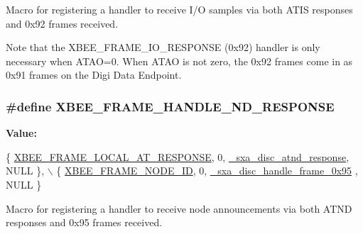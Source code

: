 Macro for registering a handler to receive I/\-O samples via both A\-T\-I\-S responses and 0x92 frames received. 

Note that the X\-B\-E\-E\-\_\-\-F\-R\-A\-M\-E\-\_\-\-I\-O\-\_\-\-R\-E\-S\-P\-O\-N\-S\-E (0x92) handler is only necessary when A\-T\-A\-O=0. When A\-T\-A\-O is not zero, the 0x92 frames come in as 0x91 frames on the Digi Data Endpoint. \hypertarget{group___s_x_a_ga988e2b4c52622034d041f38848881a09}{
\subsubsection[{X\-B\-E\-E\-\_\-\-F\-R\-A\-M\-E\-\_\-\-H\-A\-N\-D\-L\-E\-\_\-\-N\-D\-\_\-\-R\-E\-S\-P\-O\-N\-S\-E}]{\setlength{\rightskip}{0pt plus 5cm}\#define X\-B\-E\-E\-\_\-\-F\-R\-A\-M\-E\-\_\-\-H\-A\-N\-D\-L\-E\-\_\-\-N\-D\-\_\-\-R\-E\-S\-P\-O\-N\-S\-E}}\label{group___s_x_a_ga988e2b4c52622034d041f38848881a09}
{\bfseries Value\-:}
\begin{DoxyCode}
\{ \hyperlink{group__xbee__device_gga7753bbebaf00d6d64942f64b6ae9b7b9ae66771334070219cd098c8201936cf4a}{XBEE\_FRAME\_LOCAL\_AT\_RESPONSE}, 0, 
      \hyperlink{group___s_x_a_gaaa5cd9591d2c4735e4d9df944323ce17}{\_sxa\_disc\_atnd\_response}, NULL \},  \(\backslash\)
      \{ \hyperlink{group__xbee__device_gga7753bbebaf00d6d64942f64b6ae9b7b9a5b572839c3123f1059ec2ced643cf5d2}{XBEE\_FRAME\_NODE\_ID}, 0, \hyperlink{group___s_x_a_gadd7b9ea8d43a02a15c22957b936c8a71}{\_sxa\_disc\_handle\_frame\_0x95}
      , NULL \}
\end{DoxyCode}


Macro for registering a handler to receive node announcements via both A\-T\-N\-D responses and 0x95 frames received. 

